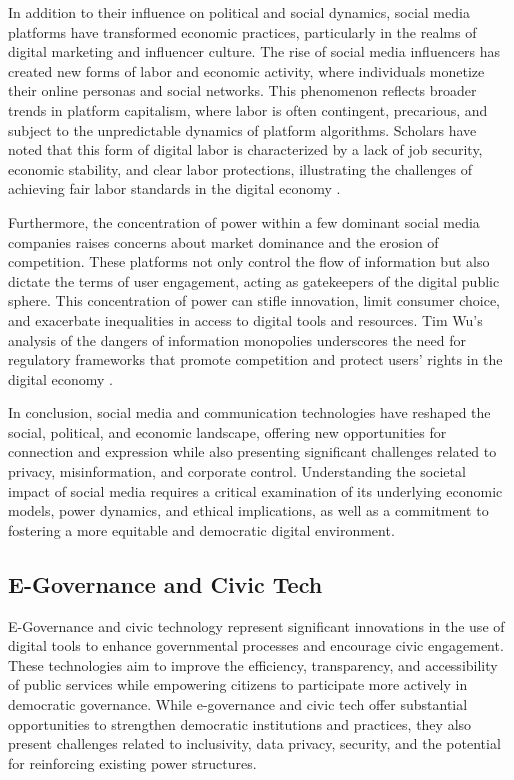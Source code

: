 \begin{refsection}
In addition to their influence on political and social dynamics, social media platforms have transformed economic practices, particularly in the realms of digital marketing and influencer culture. The rise of social media influencers has created new forms of labor and economic activity, where individuals monetize their online personas and social networks. This phenomenon reflects broader trends in platform capitalism, where labor is often contingent, precarious, and subject to the unpredictable dynamics of platform algorithms. Scholars have noted that this form of digital labor is characterized by a lack of job security, economic stability, and clear labor protections, illustrating the challenges of achieving fair labor standards in the digital economy \cite[pp.~88-91]{gillespie2018custodians}.

Furthermore, the concentration of power within a few dominant social media companies raises concerns about market dominance and the erosion of competition. These platforms not only control the flow of information but also dictate the terms of user engagement, acting as gatekeepers of the digital public sphere. This concentration of power can stifle innovation, limit consumer choice, and exacerbate inequalities in access to digital tools and resources. Tim Wu's analysis of the dangers of information monopolies underscores the need for regulatory frameworks that promote competition and protect users' rights in the digital economy \cite[pp.~45-47]{wu2020curse}.

In conclusion, social media and communication technologies have reshaped the social, political, and economic landscape, offering new opportunities for connection and expression while also presenting significant challenges related to privacy, misinformation, and corporate control. Understanding the societal impact of social media requires a critical examination of its underlying economic models, power dynamics, and ethical implications, as well as a commitment to fostering a more equitable and democratic digital environment.

\subsection{E-Governance and Civic Tech}

E-Governance and civic technology represent significant innovations in the use of digital tools to enhance governmental processes and encourage civic engagement. These technologies aim to improve the efficiency, transparency, and accessibility of public services while empowering citizens to participate more actively in democratic governance. While e-governance and civic tech offer substantial opportunities to strengthen democratic institutions and practices, they also present challenges related to inclusivity, data privacy, security, and the potential for reinforcing existing power structures.


\end{refsection}
